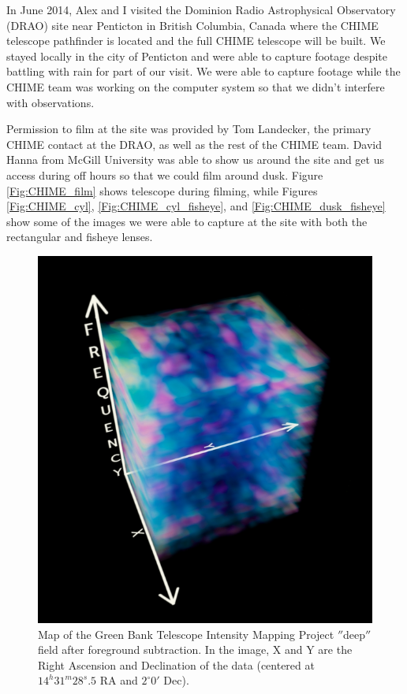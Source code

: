 In June 2014, Alex and I visited the Dominion Radio Astrophysical Observatory (DRAO) site near Penticton in British Columbia, Canada where the CHIME telescope pathfinder is located and the full CHIME telescope will be built. We stayed locally in the city of Penticton and were able to capture footage despite battling with rain for part of our visit. We were able to capture footage while the CHIME team was working on the computer system so that we didn't interfere with observations. 

Permission to film at the site was provided by Tom Landecker, the primary CHIME contact at the DRAO, as well as the rest of the CHIME team. David Hanna from McGill University was able to show us around the site and get us access during off hours so that we could film around dusk. Figure \ref{Fig:CHIME_film} shows telescope during filming, while Figures \ref{Fig:CHIME_cyl}, \ref{Fig:CHIME_cyl_fisheye}, and \ref{Fig:CHIME_dusk_fisheye} show some of the images we were able to capture at the site with both the rectangular and fisheye lenses. 

\begin{figure}[htb]
\begin{center}
\includegraphics[width=0.95\linewidth]{Planetarium/figures/GBT_cm_map.jpg}
\caption{Map of the Green Bank Telescope Intensity Mapping Project $''$deep$''$ field after foreground subtraction. In the image, X and Y are the Right Ascension and Declination of the data (centered at $14^h 31^m 28^s.5$ RA and $2^\circ 0'$ Dec). }
\label{Fig:GBT_cm_map}
\end{center}
\end{figure}



